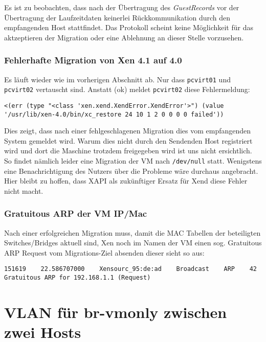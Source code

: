 Es ist zu beobachten, dass nach der Übertragung des \emph{GuestRecords} vor der Übertragung der Laufzeitdaten keinerlei Rückkommunikation durch den empfangenden Host stattfindet. Das Protokoll scheint keine Möglichkeit für das aktzeptieren der Migration oder eine Ablehnung an dieser Stelle vorzusehen.

\subsection{Fehlerhafte Migration von Xen 4.1 auf 4.0}

Es läuft wieder wie im vorherigen Abschnitt ab. Nur dass \verb#pcvirt01# und \verb#pcvirt02# vertauscht sind. Anstatt (ok) meldet \verb#pcvirt02# diese Fehlermeldung:
\setupVerbatimOut
\begin{verbatim}
<(err (type "<class 'xen.xend.XendError.XendError'>") (value '/usr/lib/xen-4.0/bin/xc_restore 24 10 1 2 0 0 0 0 failed'))
\end{verbatim}

Dies zeigt, dass nach einer fehlgeschlagenen Migration dies vom empfangenden System gemeldet wird. Warum dies nicht durch den Sendenden Host registriert wird und dort die Maschine trotzdem freigegeben wird ist uns nicht ersichtlich. So findet nämlich leider eine Migration der VM nach \verb#/dev/null# statt. Wenigstens eine Benachrichtigung des Nutzers über die Probleme wäre durchaus angebracht. Hier bleibt zu hoffen, dass XAPI als zukünftiger Ersatz für Xend diese Fehler nicht macht.

\subsection{Gratuitous ARP der VM IP/Mac}

Nach einer erfolgreichen Migration muss, damit die MAC Tabellen der beteiligten Switches/Bridges aktuell sind, Xen noch im Namen der VM einen sog. Gratuitous ARP Request vom Migrations-Ziel absenden dieser sieht so aus:

\setupVerbatimOut
\begin{verbatim}
151619    22.586707000    Xensourc_95:de:ad    Broadcast    ARP    42    Gratuitous ARP for 192.168.1.1 (Request)
\end{verbatim}


\chapter{VLAN für br-vmonly zwischen zwei Hosts}

